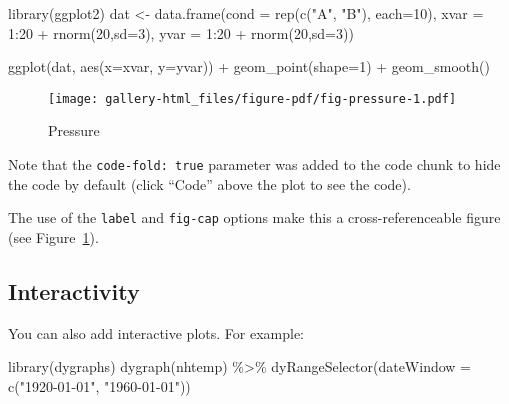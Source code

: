 \documentclass[
  letterpaper,
  DIV=11,
  numbers=noendperiod]{scrartcl}
\newenvironment{Shaded}{\begin{snugshade}}{\end{snugshade}}
\newcommand{\AttributeTok}[1]{\textcolor[rgb]{0.40,0.45,0.13}{#1}}
\newcommand{\DecValTok}[1]{\textcolor[rgb]{0.68,0.00,0.00}{#1}}
\newcommand{\FunctionTok}[1]{\textcolor[rgb]{0.28,0.35,0.67}{#1}}
\newcommand{\NormalTok}[1]{\textcolor[rgb]{0.00,0.23,0.31}{#1}}
\newcommand{\OtherTok}[1]{\textcolor[rgb]{0.00,0.23,0.31}{#1}}
\newcommand{\SpecialCharTok}[1]{\textcolor[rgb]{0.37,0.37,0.37}{#1}}
\newcommand{\StringTok}[1]{\textcolor[rgb]{0.13,0.47,0.30}{#1}}
\begin{document}
\begin{Shaded}
\begin{Highlighting}[]
\FunctionTok{library}\NormalTok{(ggplot2)}
\NormalTok{dat }\OtherTok{\textless{}{-}} \FunctionTok{data.frame}\NormalTok{(}\AttributeTok{cond =} \FunctionTok{rep}\NormalTok{(}\FunctionTok{c}\NormalTok{(}\StringTok{"A"}\NormalTok{, }\StringTok{"B"}\NormalTok{), }\AttributeTok{each=}\DecValTok{10}\NormalTok{),}
                  \AttributeTok{xvar =} \DecValTok{1}\SpecialCharTok{:}\DecValTok{20} \SpecialCharTok{+} \FunctionTok{rnorm}\NormalTok{(}\DecValTok{20}\NormalTok{,}\AttributeTok{sd=}\DecValTok{3}\NormalTok{),}
                  \AttributeTok{yvar =} \DecValTok{1}\SpecialCharTok{:}\DecValTok{20} \SpecialCharTok{+} \FunctionTok{rnorm}\NormalTok{(}\DecValTok{20}\NormalTok{,}\AttributeTok{sd=}\DecValTok{3}\NormalTok{))}

\FunctionTok{ggplot}\NormalTok{(dat, }\FunctionTok{aes}\NormalTok{(}\AttributeTok{x=}\NormalTok{xvar, }\AttributeTok{y=}\NormalTok{yvar)) }\SpecialCharTok{+}
    \FunctionTok{geom\_point}\NormalTok{(}\AttributeTok{shape=}\DecValTok{1}\NormalTok{) }\SpecialCharTok{+} 
    \FunctionTok{geom\_smooth}\NormalTok{() }
\end{Highlighting}
\end{Shaded}

\begin{figure}[tbp]

{\centering \texttt{[image: gallery-html\_files/figure-pdf/fig-pressure-1.pdf]}

}

\caption{\label{fig-pressure}Pressure}

\end{figure}

Note that the \texttt{code-fold:\ true} parameter was added to the code
chunk to hide the code by default (click ``Code'' above the plot to see
the code).

The use of the \texttt{label} and \texttt{fig-cap} options make this a
cross-referenceable figure (see Figure~\ref{fig-pressure}).

\hypertarget{interactivity}{%
\subsection{Interactivity}\label{interactivity}}

You can also add interactive plots. For example:

\begin{Shaded}
\begin{Highlighting}[]
\FunctionTok{library}\NormalTok{(dygraphs)}
\FunctionTok{dygraph}\NormalTok{(nhtemp) }\SpecialCharTok{\%\textgreater{}\%} 
  \FunctionTok{dyRangeSelector}\NormalTok{(}\AttributeTok{dateWindow =} \FunctionTok{c}\NormalTok{(}\StringTok{"1920{-}01{-}01"}\NormalTok{, }\StringTok{"1960{-}01{-}01"}\NormalTok{))}
\end{Highlighting}
\end{Shaded}
\end{document}

